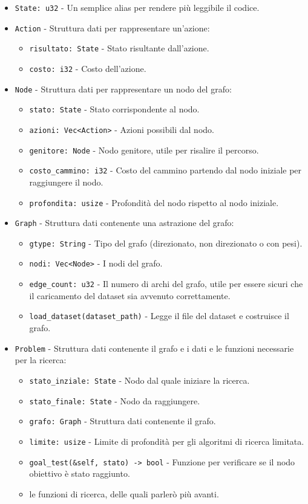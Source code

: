 \documentclass{article}
\begin{document}
\begin{itemize}
	\item \texttt{State: u32} - Un semplice alias per rendere più leggibile il codice.
	\item \texttt{Action} - Struttura dati per rappresentare un'azione:
	      \begin{itemize}
		      \item \texttt{risultato: State} - Stato risultante dall'azione.
		      \item \texttt{costo: i32} - Costo dell'azione.
	      \end{itemize}
	\item \texttt{Node} - Struttura dati per rappresentare un nodo del grafo:
	      \begin{itemize}
		      \item \texttt{stato: State} - Stato corrispondente al nodo.
		      \item \texttt{azioni: Vec<Action>} - Azioni possibili dal nodo.
		      \item \texttt{genitore: Node} - Nodo genitore, utile per risalire il percorso.
		      \item \texttt{costo\_cammino: i32} - Costo del cammino partendo dal nodo iniziale per raggiungere il nodo.
		      \item \texttt{profondita: usize} - Profondità del nodo rispetto al nodo iniziale.
	      \end{itemize}
	\item \texttt{Graph} - Struttura dati contenente una astrazione del grafo:
	      \begin{itemize}
		      \item \texttt{gtype: String} - Tipo del grafo (direzionato, non direzionato o con pesi).
		      \item \texttt{nodi: Vec<Node>} - I nodi del grafo.
		      \item \texttt{edge\_count: u32} - Il numero di archi del grafo, utile per essere sicuri che il caricamento del dataset sia avvenuto correttamente.
		      \item \texttt{load\_dataset(dataset\_path)} - Legge il file del dataset e costruisce il grafo.
	      \end{itemize}
	\item \texttt{Problem} - Struttura dati contenente il grafo e i dati e le funzioni necessarie per la ricerca:
	      \begin{itemize}
		      \item \texttt{stato\_inziale: State} - Nodo dal quale iniziare la ricerca.
		      \item \texttt{stato\_finale: State} - Nodo da raggiungere.
		      \item \texttt{grafo: Graph} - Struttura dati contenente il grafo.
		      \item \texttt{limite: usize} - Limite di profondità per gli algoritmi di ricerca limitata.
		      \item \texttt{goal\_test(\&self, stato) -> bool} - Funzione per verificare se il nodo obiettivo è stato raggiunto.
		      \item le funzioni di ricerca, delle quali parlerò più avanti.
	      \end{itemize}
\end{itemize}
\newpage
\end{document}

